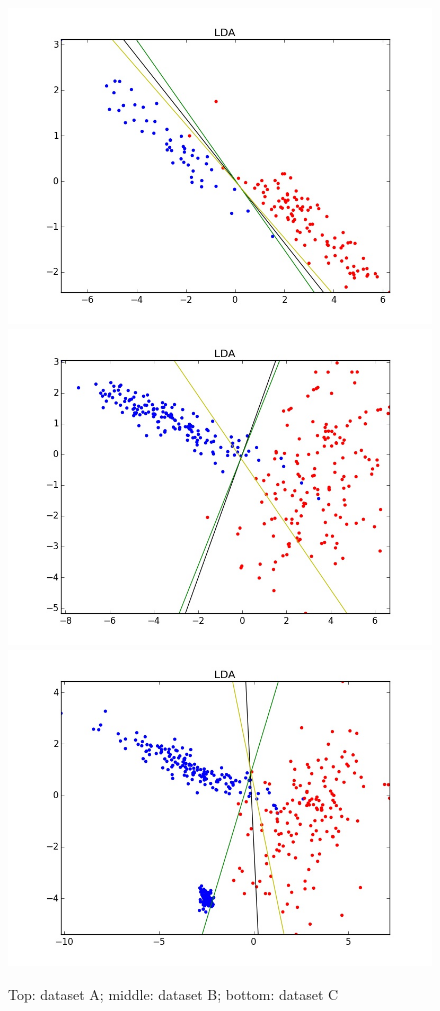 \documentclass[11pt,a4paper]{article}
\begin{document}
\begin{figure}[H]
\centering
\noindent\includegraphics[scale=0.3]{images/LDA_A.jpeg}
\noindent\includegraphics[scale=0.3]{images/LDA_B.jpeg}
\noindent\includegraphics[scale=0.3]{images/LDA_C.jpeg}
\caption{Top: dataset A; middle: dataset B; bottom: dataset C}
\end{figure}
\end{document}
